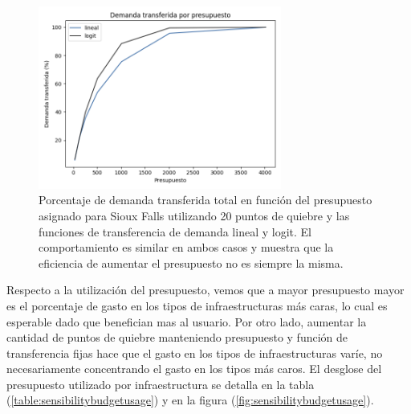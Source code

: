 \documentclass{article}
\begin{document}
  \begin{figure}[h!]
    \centering
    \includegraphics[width=8cm]{../resources/demand_by_budget.png}
      \caption{Porcentaje de demanda transferida total en función del presupuesto asignado para Sioux Falls utilizando 20 puntos de quiebre y las funciones de transferencia de demanda lineal y logit. El comportamiento es similar en ambos casos y muestra que la eficiencia de aumentar el presupuesto no es siempre la misma.}
    \label{fig:demandtransferbybudgetlinear}
  \end{figure}

  Respecto a la utilización del presupuesto, vemos que a mayor presupuesto mayor es el porcentaje de gasto en los tipos de infraestructuras más caras, lo cual es esperable dado que benefician mas al usuario. Por otro lado, aumentar la cantidad de puntos de quiebre manteniendo presupuesto y función de transferencia fijas hace que el gasto en los tipos de infraestructuras varíe, no necesariamente concentrando el gasto en los tipos más caros. El desglose del presupuesto utilizado por infraestructura se detalla en la tabla (\ref{table:sensibilitybudgetusage}) y en la figura (\ref{fig:sensibilitybudgetusage}).
\end{document}
